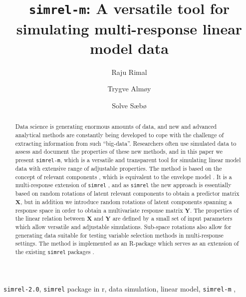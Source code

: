 \documentclass[12pt,A4paper,authoryear]{elsarticle} %
\theoremstyle{definition}
\theoremstyle{definition}
\theoremstyle{remark}
\begin{document}
\begin{frontmatter}

  \title{\texttt{simrel-m}: A versatile tool for simulating multi-response linear
model data}
    \author[]{Raju Rimal}
  
  
    \author[]{Trygve Almøy}
  
  
    \author[Norwegian University of Life Sciences]{Solve Sæbø}
  
    
  \begin{abstract}
    \small
    Data science is generating enormous amounts of data, and new and
    advanced analytical methods are constantly being developed to cope with
    the challenge of extracting information from such ``big-data''.
    Researchers often use simulated data to assess and document the
    properties of these new methods, and in this paper we present
    \texttt{simrel-m}, which is a versatile and transparent tool for
    simulating linear model data with extensive range of adjustable
    properties. The method is based on the concept of relevant components
    \citet{helland1994comparison}, which is equivalent to the envelope model
    \citet{cook2013envelopes}. It is a multi-response extension of
    \texttt{simrel} \citet{saebo2015simrel}, and as \texttt{simrel} the new
    approach is essentially based on random rotations of latent relevant
    components to obtain a predictor matrix \(\mathbf{X}\), but in addition
    we introduce random rotations of latent components spanning a response
    space in order to obtain a multivariate response matrix \(\mathbf{Y}\).
    The properties of the linear relation between \(\mathbf{X}\) and
    \(\mathbf{Y}\) are defined by a small set of input parameters which
    allow versatile and adjustable simulations. Sub-space rotations also
    allow for generating data suitable for testing variable selection
    methods in multi-response settings. The method is implemented as an
    R-package which serves as an extension of the existing \texttt{simrel}
    packages \citet{saebo2015simrel}.
  \end{abstract}
   \begin{keyword} \footnotesize \texttt{simrel-2.0}, \texttt{simrel} package in r, data
simulation, linear model, \texttt{simrel-m} \sep \end{keyword}
\end{frontmatter}
\end{document}
